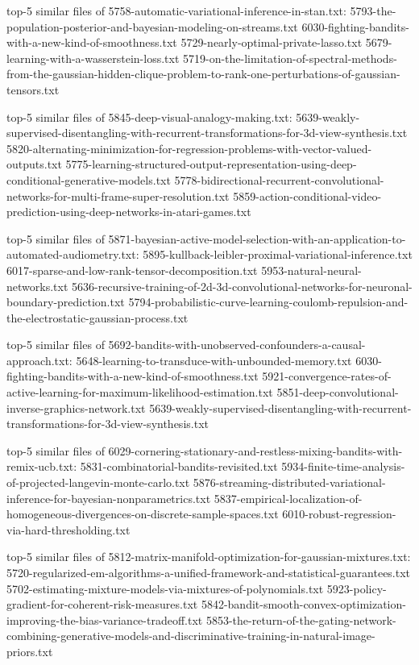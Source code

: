 \documentclass[11pt]{article}
\begin{document}
top-5 similar files of 5758-automatic-variational-inference-in-stan.txt:
5793-the-population-posterior-and-bayesian-modeling-on-streams.txt
6030-fighting-bandits-with-a-new-kind-of-smoothness.txt
5729-nearly-optimal-private-lasso.txt
5679-learning-with-a-wasserstein-loss.txt
5719-on-the-limitation-of-spectral-methods-from-the-gaussian-hidden-clique-problem-to-rank-one-perturbations-of-gaussian-tensors.txt

top-5 similar files of 5845-deep-visual-analogy-making.txt:
5639-weakly-supervised-disentangling-with-recurrent-transformations-for-3d-view-synthesis.txt
5820-alternating-minimization-for-regression-problems-with-vector-valued-outputs.txt
5775-learning-structured-output-representation-using-deep-conditional-generative-models.txt
5778-bidirectional-recurrent-convolutional-networks-for-multi-frame-super-resolution.txt
5859-action-conditional-video-prediction-using-deep-networks-in-atari-games.txt

top-5 similar files of
5871-bayesian-active-model-selection-with-an-application-to-automated-audiometry.txt:
5895-kullback-leibler-proximal-variational-inference.txt
6017-sparse-and-low-rank-tensor-decomposition.txt
5953-natural-neural-networks.txt
5636-recursive-training-of-2d-3d-convolutional-networks-for-neuronal-boundary-prediction.txt
5794-probabilistic-curve-learning-coulomb-repulsion-and-the-electrostatic-gaussian-process.txt

top-5 similar files of
5692-bandits-with-unobserved-confounders-a-causal-approach.txt:
5648-learning-to-transduce-with-unbounded-memory.txt
6030-fighting-bandits-with-a-new-kind-of-smoothness.txt
5921-convergence-rates-of-active-learning-for-maximum-likelihood-estimation.txt
5851-deep-convolutional-inverse-graphics-network.txt
5639-weakly-supervised-disentangling-with-recurrent-transformations-for-3d-view-synthesis.txt

top-5 similar files of
6029-cornering-stationary-and-restless-mixing-bandits-with-remix-ucb.txt:
5831-combinatorial-bandits-revisited.txt
5934-finite-time-analysis-of-projected-langevin-monte-carlo.txt
5876-streaming-distributed-variational-inference-for-bayesian-nonparametrics.txt
5837-empirical-localization-of-homogeneous-divergences-on-discrete-sample-spaces.txt
6010-robust-regression-via-hard-thresholding.txt

top-5 similar files of
5812-matrix-manifold-optimization-for-gaussian-mixtures.txt:
5720-regularized-em-algorithms-a-unified-framework-and-statistical-guarantees.txt
5702-estimating-mixture-models-via-mixtures-of-polynomials.txt
5923-policy-gradient-for-coherent-risk-measures.txt
5842-bandit-smooth-convex-optimization-improving-the-bias-variance-tradeoff.txt
5853-the-return-of-the-gating-network-combining-generative-models-and-discriminative-training-in-natural-image-priors.txt
\end{document}
